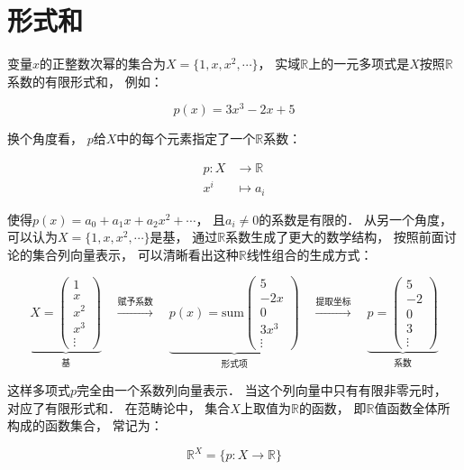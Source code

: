 \documentclass[10pt, openany]{book}
\begin{document}
\section{形式和}

变量$x$的正整数次幂的集合为$X = \{1,x,x^2,\cdots\}$，
实域$\mathbb R$上的一元多项式是$X$按照$\mathbb R$系数的有限形式和，
例如：

$$
p(x) = 3x^3 - 2x + 5
$$

换个角度看，
$p$给$X$中的每个元素指定了一个$\mathbb R$系数：

$$
\begin{aligned}
p: X &\to \mathbb R \\
x^i &\mapsto a_i
\end{aligned}
$$

使得$p(x) = a_0 + a_1 x + a_2 x^2 + \cdots$，
且$a_i \neq 0$的系数是有限的．
从另一个角度，
可以认为$X = \{1,x,x^2,\cdots\}$是基，
通过$\mathbb R$系数生成了更大的数学结构，
按照前面讨论的集合列向量表示，
可以清晰看出这种$\mathbb R$线性组合的生成方式：

\begin{equation}
\underbrace{X=\begin{pmatrix}1 \\ x \\ x^2 \\ x^3 \\ \vdots \end{pmatrix}}_{\text{基}}
\quad \xrightarrow{\text{赋予系数}} \quad
\underbrace{p(x)=\text{sum}\begin{pmatrix}5 \\ -2 x \\ 0 \\ 3 x^3 \\ \vdots\end{pmatrix}}_{\text{形式项}}
\quad \xrightarrow{\text{提取坐标}} \quad
\underbrace{p=\begin{pmatrix}5 \\ -2 \\ 0 \\ 3 \\ \vdots\end{pmatrix}}_{\text{系数}}
\end{equation}\label{eq:polynomial-vector}

这样多项式$p$完全由一个系数列向量表示．
当这个列向量中只有有限非零元时，
对应了有限形式和．
在范畴论中，
集合$X$上取值为$\mathbb R$的函数，
即$\mathbb R$值函数全体所构成的函数集合，
常记为：

$$
\mathbb R^X = \{p: X \to \mathbb R \} 
$$
\end{document}
